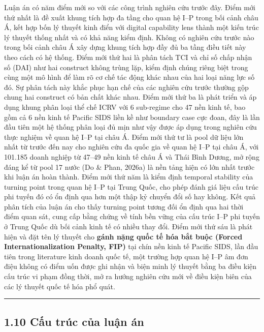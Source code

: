 \documentclass[12pt,a4paper]{article}
\begin{document}
Luận án có năm điểm mới so với các công trình nghiên cứu trước đây. Điểm
mới thứ nhất là đề xuất khung tích hợp đa tầng cho quan hệ I--P trong
bối cảnh châu Á, kết hợp bốn lý thuyết kinh điển với digital capability
lens thành một kiến trúc lý thuyết thống nhất và có khả năng kiểm định.
Không có nghiên cứu trước nào trong bối cảnh châu Á xây dựng khung tích
hợp đầy đủ ba tầng điều tiết này theo cách có hệ thống. Điểm mới thứ hai
là phân tách TCI và chỉ số chấp nhận số (DAI) như hai construct không
trùng lặp, kiểm định chúng riêng biệt trong cùng một mô hình để làm rõ
cơ chế tác động khác nhau của hai loại năng lực số đó. Sự phân tách này
khắc phục hạn chế của các nghiên cứu trước thường gộp chung hai
construct có bản chất khác nhau. Điểm mới thứ ba là phát triển và áp
dụng khung phân loại thể chế ICRV với 6 sub-regime cho 47 nền kinh tế,
bao gồm cả 6 nền kinh tế Pacific SIDS liền kề như boundary case cực
đoan, đây là lần đầu tiên một hệ thống phân loại đủ mịn như vậy được áp
dụng trong nghiên cứu thực nghiệm về quan hệ I--P tại châu Á. Điểm mới
thứ tư là pool dữ liệu lớn nhất từ trước đến nay cho nghiên cứu đa quốc
gia về quan hệ I--P tại châu Á, với 101.185 doanh nghiệp từ 47--49 nền
kinh tế châu Á và Thái Bình Dương, mở rộng đáng kể từ pool 17 nước (Do
\& Phan, 2026a) là nền tảng hiện có lớn nhất trước khi luận án hoàn
thành. Điểm mới thứ năm là kiểm định temporal stability của turning
point trong quan hệ I--P tại Trung Quốc, cho phép đánh giá liệu cấu trúc
phi tuyến đó có ổn định qua hơn một thập kỷ chuyển đổi số hay không. Kết
quả phân tích của luận án cho thấy turning point tương đối ổn định qua
hai thời điểm quan sát, cung cấp bằng chứng về tính bền vững của cấu
trúc I--P phi tuyến ở Trung Quốc dù bối cảnh kinh tế có nhiều thay đổi.
Điểm mới thứ sáu là phát hiện và đặt tên lý thuyết cho \textbf{gánh nặng
quốc tế hóa bắt buộc (Forced Internationalization Penalty, FIP)} tại
chín nền kinh tế Pacific SIDS, lần đầu tiên trong literature kinh doanh
quốc tế, một trường hợp quan hệ I--P âm đơn điệu không có điểm uốn được
ghi nhận và biện minh lý thuyết bằng ba điều kiện cấu trúc vi phạm đồng
thời, mở ra hướng nghiên cứu mới về điều kiện biên của các lý thuyết
quốc tế hóa phổ quát.

\begin{center}\rule{0.5\linewidth}{0.5pt}\end{center}

\hypertarget{110-cux1ea5u-truxfac-cux1ee7a-luux1eadn-uxe1n}{%
\subsection{1.10 Cấu trúc của luận
án}\label{110-cux1ea5u-truxfac-cux1ee7a-luux1eadn-uxe1n}}
\end{document}
